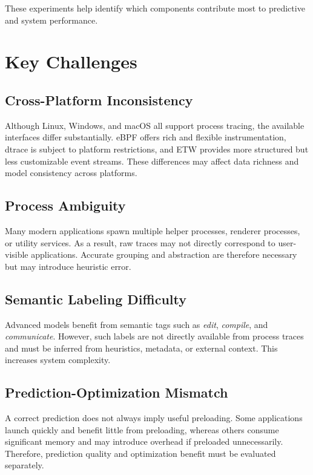 \documentclass[11pt]{article}
\begin{document}
These experiments help identify which components contribute most to predictive and system performance.

\section{Key Challenges}

\subsection{Cross-Platform Inconsistency}

Although Linux, Windows, and macOS all support process tracing, the available interfaces differ substantially. eBPF offers rich and flexible instrumentation, dtrace is subject to platform restrictions, and ETW provides more structured but less customizable event streams. These differences may affect data richness and model consistency across platforms.

\subsection{Process Ambiguity}

Many modern applications spawn multiple helper processes, renderer processes, or utility services. As a result, raw traces may not directly correspond to user-visible applications. Accurate grouping and abstraction are therefore necessary but may introduce heuristic error.

\subsection{Semantic Labeling Difficulty}

Advanced models benefit from semantic tags such as \textit{edit}, \textit{compile}, and \textit{communicate}. However, such labels are not directly available from process traces and must be inferred from heuristics, metadata, or external context. This increases system complexity.

\subsection{Prediction-Optimization Mismatch}

A correct prediction does not always imply useful preloading. Some applications launch quickly and benefit little from preloading, whereas others consume significant memory and may introduce overhead if preloaded unnecessarily. Therefore, prediction quality and optimization benefit must be evaluated separately.
\end{document}
